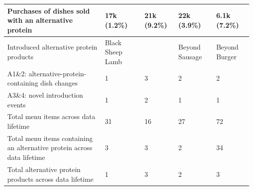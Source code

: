 \begin{longtable}{@{}V{3.0cm}V{\dimexpr(\linewidth-3.0cm-30pt)/4\relax}V{\dimexpr(\linewidth-3.0cm-30pt)/4\relax}V{\dimexpr(\linewidth-3.0cm-30pt)/4\relax}V{\dimexpr(\linewidth-3.0cm-30pt)/4\relax}@{}}
\midrule[0.1pt]
Purchases of dishes sold with an alternative protein & 17k (1.2\%) & 21k (9.2\%) & 22k (3.9\%) & 6.1k (7.2\%) \\*
\midrule[0.1pt]
Introduced alternative protein products & Black Sheep Lamb &  & Beyond Sausage & Beyond Burger \\*
\midrule[0.1pt]
A1\&2: alternative-protein-containing dish changes & 1 & 3 & 2 & 2 \\*
\midrule[0.1pt]
A3\&4: novel introduction events & 1 & 2 & 1 & 1 \\*
\midrule[0.1pt]
Total menu items across data lifetime & 31 & 16 & 27 & 72 \\*
\midrule[0.1pt]
Total menu items containing an alternative protein across data lifetime & 3 & 3 & 2 & 34 \\*
\midrule[0.1pt]
Total alternative protein products across data lifetime & 1 & 3 & 2 & 3 \\
\end{longtable}
\newpage
